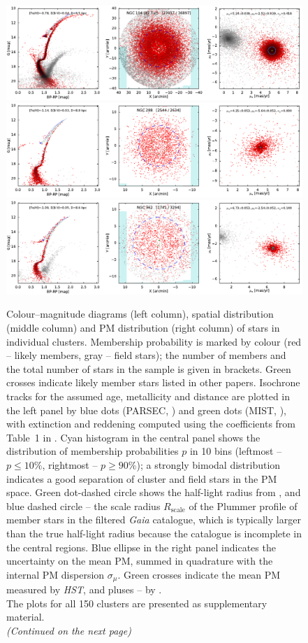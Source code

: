 \documentclass[usenatbib]{mnras}
\newcommand{\Gaia}{\textit{Gaia}\xspace}
\newcommand{\HST}{\textit{HST}\xspace}
\begin{document}
\clearpage\begin{figure}
\includegraphics{figs/NGC_104_47Tuc.pdf}
\includegraphics{figs/NGC_288.pdf}
\includegraphics{figs/NGC_362.pdf}
\caption{
Colour--magnitude diagrams (left column), spatial distribution (middle column) and PM distribution (right column) of stars in individual clusters.
Membership probability is marked by colour (red -- likely members, gray -- field stars); the number of members and the total number of stars in the sample is given in brackets.
Green crosses indicate likely member stars listed in other papers. 
Isochrone tracks for the assumed age, metallicity and distance are plotted in the left panel by blue dots (PARSEC, \citealt{Bressan2012}) and green dots (MIST, \citealt{Choi2016}), with extinction and reddening computed using the coefficients from Table~1 in \citet{Babusiaux2018}.
Cyan histogram in the central panel shows the distribution of membership probabilities $p$ in 10 bins (leftmost -- $p\le 10\%$, rightmost -- $p\ge 90\%$); a strongly bimodal distribution indicates a good separation of cluster and field stars in the PM space. Green dot-dashed circle shows the half-light radius from \citet{Baumgardt2019}, and blue dashed circle -- the scale radius $R_\mathrm{scale}$ of the Plummer profile of member stars in the filtered \Gaia catalogue, which is typically larger than the true half-light radius because the catalogue is incomplete in the central regions.
Blue ellipse in the right panel indicates the uncertainty on the mean PM, summed in quadrature with the internal PM dispersion $\sigma_\mu$. Green crosses indicate the mean PM measured by \HST, and pluses -- by \citet{Helmi2018}.\protect\\
The plots for all 150 clusters are presented as supplementary material.
\protect\\
\textit{(Continued on the next page)}
}
\end{figure}
\end{document}
